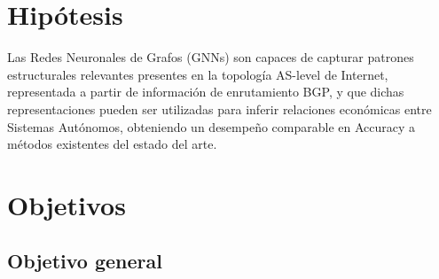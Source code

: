 \section{Hipótesis}

Las Redes Neuronales de Grafos (GNNs) son capaces de capturar patrones estructurales relevantes 
presentes en la topología AS-level de Internet, representada a partir de información de enrutamiento BGP,
 y que dichas representaciones pueden ser utilizadas para inferir relaciones económicas entre Sistemas Autónomos, 
obteniendo un desempeño comparable en Accuracy a métodos existentes del estado del arte.~\cite{UnveilingtheTypeRelationshipBetweenAutonomousSystemsUsingDeepLearning,ASRank}



\section{Objetivos}

\subsection{Objetivo general}



